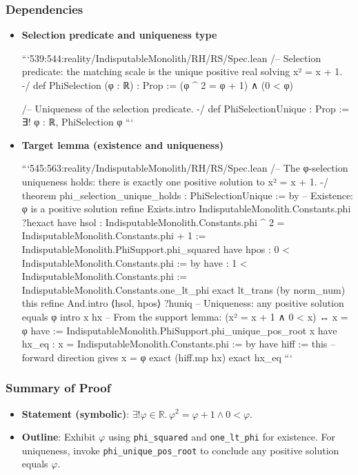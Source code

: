 \documentclass{article}
\begin{document}
\subsubsection{Dependencies}
\begin{itemize}[leftmargin=*]
  \item \textbf{Selection predicate and uniqueness type}

```539:544:reality/IndisputableMonolith/RH/RS/Spec.lean
/-- Selection predicate: the matching scale is the unique positive real solving x² = x + 1. -/
 def PhiSelection (φ : ℝ) : Prop := (φ ^ 2 = φ + 1) ∧ (0 < φ)

/-- Uniqueness of the selection predicate. -/
 def PhiSelectionUnique : Prop := ∃! φ : ℝ, PhiSelection φ
```

  \item \textbf{Target lemma (existence and uniqueness)}

```545:563:reality/IndisputableMonolith/RH/RS/Spec.lean
/-- The φ‑selection uniqueness holds: there is exactly one positive solution to x² = x + 1. -/
 theorem phi_selection_unique_holds : PhiSelectionUnique := by
  -- Existence: φ is a positive solution
  refine Exists.intro IndisputableMonolith.Constants.phi ?hexact
  have hsol : IndisputableMonolith.Constants.phi ^ 2 = IndisputableMonolith.Constants.phi + 1 :=
    IndisputableMonolith.PhiSupport.phi_squared
  have hpos : 0 < IndisputableMonolith.Constants.phi := by
    have : 1 < IndisputableMonolith.Constants.phi := IndisputableMonolith.Constants.one_lt_phi
    exact lt_trans (by norm_num) this
  refine And.intro ⟨hsol, hpos⟩ ?huniq
  -- Uniqueness: any positive solution equals φ
  intro x hx
  -- From the support lemma: (x² = x + 1 ∧ 0 < x) ↔ x = φ
  have := IndisputableMonolith.PhiSupport.phi_unique_pos_root x
  have hx_eq : x = IndisputableMonolith.Constants.phi := by
    have hiff := this
    -- forward direction gives x = φ
    exact (hiff.mp hx)
  exact hx_eq
```
\end{itemize}

\subsubsection{Summary of Proof}
\begin{itemize}[leftmargin=*]
  \item \textbf{Statement (symbolic)}: \(\exists! φ \in \mathbb{R}.\, φ^2 = φ + 1 \land 0 < φ\).
  \item \textbf{Outline}: Exhibit \(φ\) using \texttt{phi\_squared} and \texttt{one\_lt\_phi} for existence. For uniqueness, invoke \texttt{phi\_unique\_pos\_root} to conclude any positive solution equals \(φ\).
\end{itemize}
\end{document}
